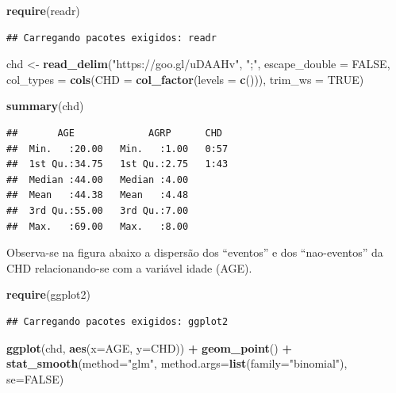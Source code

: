 \documentclass[12pt,brazil,]{book}
\newenvironment{Shaded}{\begin{snugshade}}{\end{snugshade}}
\newcommand{\DataTypeTok}[1]{\textcolor[rgb]{0.13,0.29,0.53}{#1}}
\newcommand{\KeywordTok}[1]{\textcolor[rgb]{0.13,0.29,0.53}{\textbf{#1}}}
\newcommand{\NormalTok}[1]{#1}
\newcommand{\OperatorTok}[1]{\textcolor[rgb]{0.81,0.36,0.00}{\textbf{#1}}}
\newcommand{\OtherTok}[1]{\textcolor[rgb]{0.56,0.35,0.01}{#1}}
\newcommand{\StringTok}[1]{\textcolor[rgb]{0.31,0.60,0.02}{#1}}
\begin{document}
\begin{Shaded}
\begin{Highlighting}[]
\KeywordTok{require}\NormalTok{(readr)}
\end{Highlighting}
\end{Shaded}

\begin{verbatim}
## Carregando pacotes exigidos: readr
\end{verbatim}

\begin{Shaded}
\begin{Highlighting}[]
\NormalTok{chd <-}\StringTok{ }\KeywordTok{read_delim}\NormalTok{(}\StringTok{"https://goo.gl/uDAAHv"}\NormalTok{, }
    \StringTok{";"}\NormalTok{, }\DataTypeTok{escape_double =} \OtherTok{FALSE}\NormalTok{, }\DataTypeTok{col_types =} \KeywordTok{cols}\NormalTok{(}\DataTypeTok{CHD =} \KeywordTok{col_factor}\NormalTok{(}\DataTypeTok{levels =} \KeywordTok{c}\NormalTok{())), }
    \DataTypeTok{trim_ws =} \OtherTok{TRUE}\NormalTok{)}

\KeywordTok{summary}\NormalTok{(chd)}
\end{Highlighting}
\end{Shaded}

\begin{verbatim}
##       AGE             AGRP      CHD   
##  Min.   :20.00   Min.   :1.00   0:57  
##  1st Qu.:34.75   1st Qu.:2.75   1:43  
##  Median :44.00   Median :4.00         
##  Mean   :44.38   Mean   :4.48         
##  3rd Qu.:55.00   3rd Qu.:7.00         
##  Max.   :69.00   Max.   :8.00
\end{verbatim}

Observa-se na figura abaixo a dispersão dos ``eventos'' e dos
``nao-eventos'' da CHD relacionando-se com a variável idade (AGE).

\begin{Shaded}
\begin{Highlighting}[]
\KeywordTok{require}\NormalTok{(ggplot2)}
\end{Highlighting}
\end{Shaded}

\begin{verbatim}
## Carregando pacotes exigidos: ggplot2
\end{verbatim}

\begin{Shaded}
\begin{Highlighting}[]
\KeywordTok{ggplot}\NormalTok{(chd, }\KeywordTok{aes}\NormalTok{(}\DataTypeTok{x=}\NormalTok{AGE, }\DataTypeTok{y=}\NormalTok{CHD)) }\OperatorTok{+}\StringTok{ }
\StringTok{  }\KeywordTok{geom_point}\NormalTok{() }\OperatorTok{+}\StringTok{ }
\StringTok{  }\KeywordTok{stat_smooth}\NormalTok{(}\DataTypeTok{method=}\StringTok{"glm"}\NormalTok{, }\DataTypeTok{method.args=}\KeywordTok{list}\NormalTok{(}\DataTypeTok{family=}\StringTok{"binomial"}\NormalTok{), }\DataTypeTok{se=}\OtherTok{FALSE}\NormalTok{)}
\end{Highlighting}
\end{Shaded}
\end{document}
